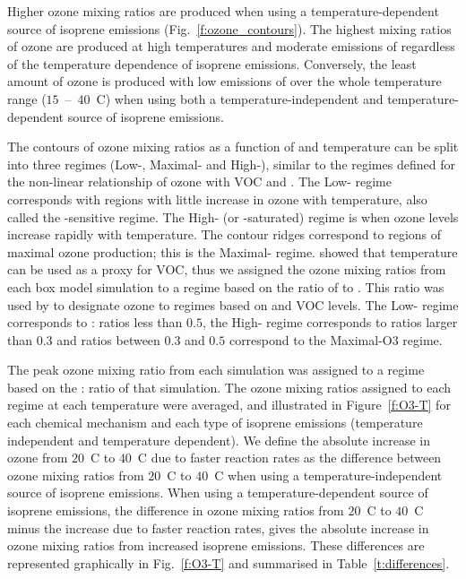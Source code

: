 Higher ozone mixing ratios are produced when using a temperature-dependent source of isoprene emissions (Fig.~\ref{f:ozone_contours}).
The highest mixing ratios of ozone are produced at high temperatures and moderate emissions of  regardless of the temperature dependence of isoprene emissions.
Conversely, the least amount of ozone is produced with low emissions of  over the whole temperature range ($15$~--~$40$~\degree C) when using both a temperature-independent and temperature-dependent source of isoprene emissions.

The contours of ozone mixing ratios as a function of  and temperature can be split into three  regimes (Low-, Maximal- and High-), similar to the  regimes defined for the non-linear relationship of ozone with VOC and .
The Low- regime corresponds with regions with little increase in ozone with temperature, also called the -sensitive regime.
The High- (or -saturated) regime is when ozone levels increase rapidly with temperature. 
The contour ridges correspond to regions of maximal ozone production; this is the Maximal- regime.
\citet{Pusede:2014} showed that temperature can be used as a proxy for VOC, thus we assigned the ozone mixing ratios from each box model simulation to a  regime based on the ratio of  to .
This ratio was used by \citet{Sillman:1995} to designate ozone to  regimes based on  and VOC levels. 
The Low- regime corresponds to : ratios less than $0.5$, the High- regime corresponds to ratios larger than $0.3$ and ratios between $0.3$ and $0.5$ correspond to the Maximal-O3 regime.

The peak ozone mixing ratio from each simulation was assigned to a  regime based on the : ratio of that simulation.
The ozone mixing ratios assigned to each  regime at each temperature were averaged, and illustrated in Figure~\ref{f:O3-T} for each chemical mechanism and each type of isoprene emissions (temperature independent and temperature dependent).  
We define the absolute increase in ozone from $20$~\degree C to $40$~\degree C due to faster reaction rates as the difference between ozone mixing ratios from $20$~\degree C to $40$~\degree C when using a temperature-independent source of isoprene emissions.
When using a temperature-dependent source of isoprene emissions, the difference in ozone mixing ratios from $20$~\degree C to $40$~\degree C minus the increase due to faster reaction rates, gives the absolute increase in ozone mixing ratios from increased isoprene emissions.
These differences are represented graphically in Fig.~\ref{f:O3-T} and summarised in Table~\ref{t:differences}.


